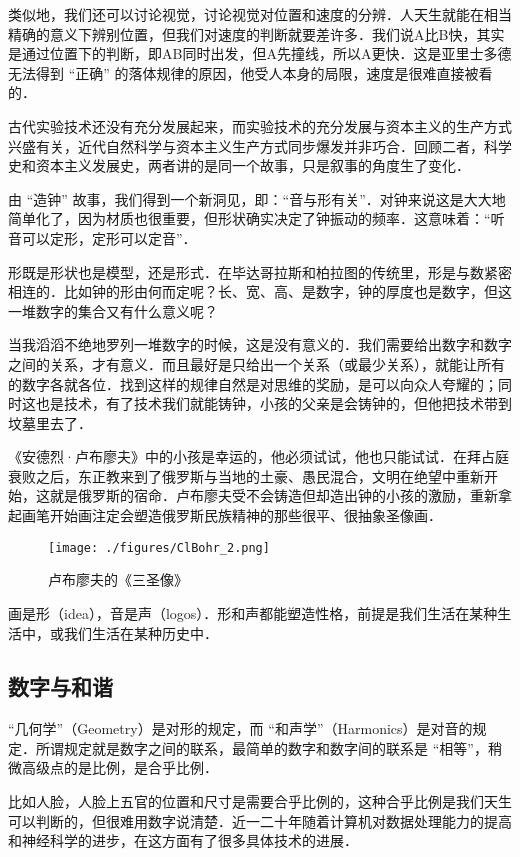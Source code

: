 类似地，我们还可以讨论视觉，讨论视觉对位置和速度的分辨．人天生就能在相当精确的意义下辨别位置，但我们对速度的判断就要差许多．我们说A比B快，其实是通过位置下的判断，即AB同时出发，但A先撞线，所以A更快．这是亚里士多德无法得到 “正确” 的落体规律的原因，他受人本身的局限，速度是很难直接被看的．

古代实验技术还没有充分发展起来，而实验技术的充分发展与资本主义的生产方式兴盛有关，近代自然科学与资本主义生产方式同步爆发并非巧合．回顾二者，科学史和资本主义发展史，两者讲的是同一个故事，只是叙事的角度生了变化．

由 “造钟” 故事，我们得到一个新洞见，即：“音与形有关”．对钟来说这是大大地简单化了，因为材质也很重要，但形状确实决定了钟振动的频率．这意味着：“听音可以定形，定形可以定音”．

形既是形状也是模型，还是形式．在毕达哥拉斯和柏拉图的传统里，形是与数紧密相连的．比如钟的形由何而定呢？长、宽、高、是数字，钟的厚度也是数字，但这一堆数字的集合又有什么意义呢？

当我滔滔不绝地罗列一堆数字的时候，这是没有意义的．我们需要给出数字和数字之间的关系，才有意义．而且最好是只给出一个关系（或最少关系），就能让所有的数字各就各位．找到这样的规律自然是对思维的奖励，是可以向众人夸耀的；同时这也是技术，有了技术我们就能铸钟，小孩的父亲是会铸钟的，但他把技术带到坟墓里去了．

《安德烈·卢布廖夫》中的小孩是幸运的，他必须试试，他也只能试试．在拜占庭衰败之后，东正教来到了俄罗斯与当地的土豪、愚民混合，文明在绝望中重新开始，这就是俄罗斯的宿命．卢布廖夫受不会铸造但却造出钟的小孩的激励，重新拿起画笔开始画注定会塑造俄罗斯民族精神的那些很平、很抽象圣像画．

\begin{figure}[ht]
\centering
\texttt{[image: ./figures/ClBohr\_2.png]}
\caption{卢布廖夫的《三圣像》} \label{ClBohr_fig2}
\end{figure}

画是形（idea），音是声（logos）．形和声都能塑造性格，前提是我们生活在某种生活中，或我们生活在某种历史中．

\subsection{数字与和谐}

“几何学”（Geometry）是对形的规定，而 “和声学”（Harmonics）是对音的规定．所谓规定就是数字之间的联系，最简单的数字和数字间的联系是 “相等”，稍微高级点的是比例，是合乎比例．

比如人脸，人脸上五官的位置和尺寸是需要合乎比例的，这种合乎比例是我们天生可以判断的，但很难用数字说清楚．近一二十年随着计算机对数据处理能力的提高和神经科学的进步，在这方面有了很多具体技术的进展．

